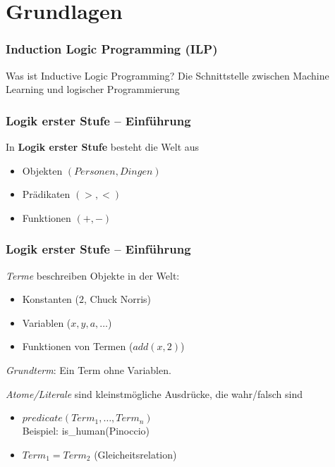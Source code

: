 \section{Grundlagen}

\begin{frame}
	\frametitle{Induction Logic Programming (ILP)}

	\begin{block}{Was ist Inductive Logic Programming?}
			Die Schnittstelle zwischen Machine Learning und logischer Programmierung
	\end{block}
\end{frame}

\begin{frame}
	\frametitle{Logik erster Stufe -- Einführung}

	In \textbf{Logik erster Stufe} besteht die Welt aus
	\begin{itemize}
		\item Objekten  $(Personen, Dingen)$
		\item Prädikaten $(>, <)$
		\item Funktionen $(+, -)$
	\end{itemize}
\end{frame}

\begin{frame}
	\frametitle{Logik erster Stufe -- Einführung}
	\emph{Terme} beschreiben Objekte in der Welt:\\
	\begin{itemize}
		\item Konstanten  ($2$, Chuck Norris)
		\item Variablen   ($x,y, a, \ldots$)
		\item Funktionen von Termen ($add(x,2)$)
	\end{itemize}

	\emph{Grundterm}: Ein Term ohne Variablen.
	\pause

	\vspace{15pt}
	\emph{Atome/Literale} sind kleinstmögliche Ausdrücke, die wahr/falsch sind
	\begin{itemize}
		\item $predicate(Term_1, \ldots, Term_n)$\\ 
			Beispiel: is\_human(Pinoccio)
		\item $Term_1 = Term_2$ (Gleicheitsrelation)
	\end{itemize}

\end{frame}

